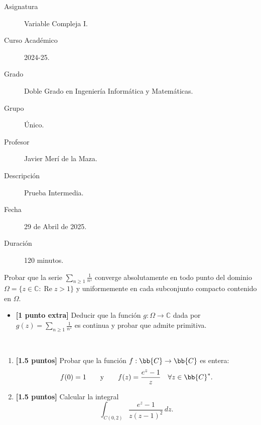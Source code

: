 \documentclass[12pt]{article}
\renewcommand{\Re}{\operatorname{Re}} %
\begin{document}

    
    

    \begin{description}
        \item[Asignatura] Variable Compleja I.
        \item[Curso Académico] 2024-25.
        \item[Grado] Doble Grado en Ingeniería Informática y Matemáticas.
        \item[Grupo] Único.
        \item[Profesor] Javier Merí de la Maza.
        \item[Descripción] Prueba Intermedia.
        \item[Fecha] 29 de Abril de 2025.
        \item[Duración] 120 minutos.
    \end{description}
    \newpage

    \begin{ejercicio}[3.5 puntos]
        Probar que la serie $\sum\limits_{n \geq 1} \frac{1}{n^z}$ converge absolutamente en todo punto del dominio $\Omega = \{z \in \mathbb{C} : \Re z > 1\}$ y uniformemente en cada subconjunto compacto contenido en $\Omega$.
        \begin{itemize}
            \item \textbf{[1 punto extra]} Deducir que la función $g : \Omega \to \mathbb{C}$ dada por $g(z)=\sum\limits_{n \geq 1} \frac{1}{n^z}$ es continua y probar que admite primitiva.
        \end{itemize}
    \end{ejercicio}

    \begin{ejercicio}~
        \begin{enumerate}
            \item \textbf{[1.5 puntos]} Probar que la función $f:\bb{C}\to \bb{C}$ es entera:
            \begin{equation*}
                f(0)=1\qquad \text{y}\qquad f(z)=\dfrac{e^z-1}{z}\quad \forall z\in\bb{C}^*.
            \end{equation*}

            \item \textbf{[1.5 puntos]} Calcular la integral
            \begin{equation*}
                \int_{C(0,2)} \frac{e^z-1}{z(z - 1)^2} \, dz.
            \end{equation*}
        \end{enumerate}
    \end{ejercicio}
\end{document}
